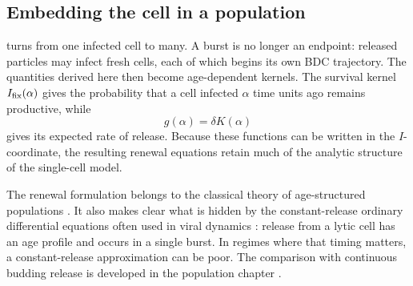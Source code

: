 \subsection{Embedding the cell in a population}
\label{bdc:sec:next-population}

 turns from one infected cell to many. A burst is no
longer an endpoint: released particles may infect fresh cells, each of which
begins its own BDC trajectory. The quantities derived here then become
age-dependent kernels. The survival kernel $I_{\mathrm{fix}}(\alpha)$ gives the probability
that a cell infected $\alpha$ time units ago remains productive, while
\[
g(\alpha)=\delta K(\alpha)
\]
gives its expected rate of release. Because these functions can be written in
the $I$-coordinate, the resulting renewal equations retain much of the analytic
structure of the single-cell model.

The renewal formulation belongs to the classical theory of age-structured
populations \cite{mckendrick1926applications,vonfoerster1959some}. It also makes
clear what is hidden by the constant-release ordinary differential equations
often used in viral dynamics
\cite{perelson1996hiv,nowak1996population}: release from a
lytic cell has an age profile and occurs in a single burst. In regimes where
that timing matters, a constant-release approximation can be poor. The
comparison with continuous budding release is developed in the population
chapter \cite{pearson2011stochastic,gilchrist2006evolution,wang2006lysis}.

\FloatBarrier

